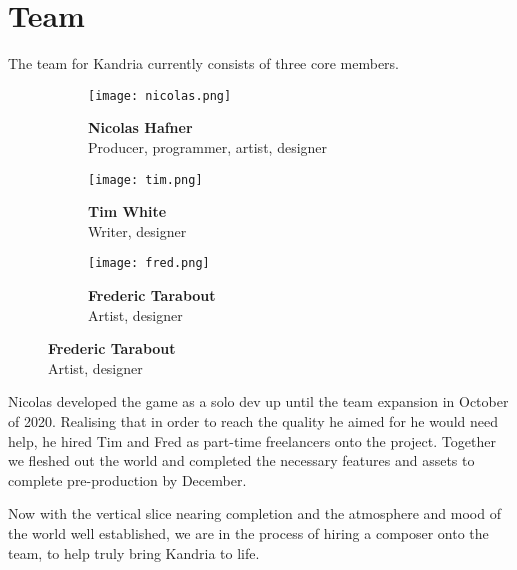 \section{Team}
The team for Kandria currently consists of three core members.

\begin{figure}[h]
  \centering
  \begin{subfigure}[t]{0.3\textwidth}
    \centering
    \texttt{[image: nicolas.png]}
    \caption{\centering\textbf{Nicolas Hafner}\\Producer, programmer, artist, designer}
  \end{subfigure}
  \begin{subfigure}[t]{0.3\textwidth}
    \centering
    \texttt{[image: tim.png]}
    \caption{\centering\textbf{Tim White}\\Writer, designer}
  \end{subfigure}
  \begin{subfigure}[t]{0.3\textwidth}
    \centering
    \texttt{[image: fred.png]}
    \caption{\centering\textbf{Frederic Tarabout}\\Artist, designer}
  \end{subfigure}
\end{figure}

Nicolas developed the game as a solo dev up until the team expansion in October of 2020. Realising that in order to reach the quality he aimed for he would need help, he hired Tim and Fred as part-time freelancers onto the project. Together we fleshed out the world and completed the necessary features and assets to complete pre-production by December.

Now with the vertical slice nearing completion and the atmosphere and mood of the world well established, we are in the process of hiring a composer onto the team, to help truly bring Kandria to life.

